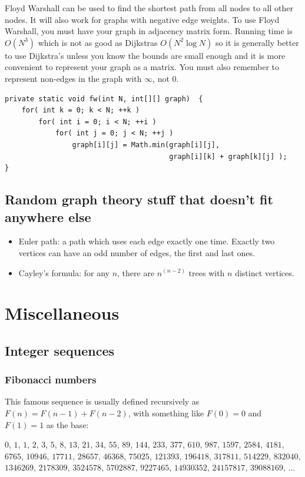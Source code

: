 \documentclass[a4paper,12pt]{article}
\begin{document}
Floyd Warshall can be used to find the shortest path from all nodes to all other nodes. It will also work for graphs with negative edge weights. To use Floyd Warshall, you must have your graph in adjacency matrix form. Running time is $O(N^3)$ which is not as good as Dijkstras $O(N^2\log N)$ so it is generally better to use Dijkstra's unless you know the bounds are small enough and it is more convenient to represent your graph as a matrix. You must also remember to represent non-edges in the graph with $\infty$, not 0.

\begin{lstlisting}
private static void fw(int N, int[][] graph)  {
	for( int k = 0; k < N; ++k )
	    for( int i = 0; i < N; ++i )
			for( int j = 0; j < N; ++j )
				graph[i][j] = Math.min(graph[i][j], 
									   graph[i][k] + graph[k][j] );
}
\end{lstlisting}

\subsection{Random graph theory stuff that doesn't fit anywhere else}
\begin{itemize}\item Euler path: a path which uses each edge exactly one time. Exactly two vertices can have an odd number of edges, the first and last ones.
\item Cayley's formula: for any $n$, there are $n^{(n-2)}$ trees with $n$ distinct vertices.
\end{itemize}

\newpage\section{Miscellaneous}

\subsection{Integer sequences}
\subsubsection{Fibonacci numbers}
This famous sequence is usually defined recursively as $F(n)=F(n-1)+F(n-2)$, with something like $F(0)=0$ and $F(1)=1$ as the base:

\begin{center}$0$, $1$, $1$, $2$, $3$, $5$, $8$, $13$, $21$, $34$, $55$, $89$, $144$, $233$, $377$, $610$, $987$, $1597$, $2584$, $4181$, $6765$, $10946$, $17711$, $28657$, $46368$, $75025$, $121393$, $196418$, $317811$, $514229$, $832040$, $1346269$, $2178309$, $3524578$, $5702887$, $9227465$, $14930352$, $24157817$, $39088169$, $\ldots$\end{center}
\end{document}

